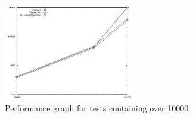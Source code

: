 \begin{figure}[ht] \centering
\includegraphics[width=0.5\textwidth]{src/over_10000.png}
\caption{Performance graph for tests containing over 10000} \end{figure}
